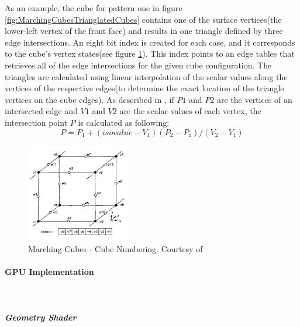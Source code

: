 \documentclass[]{article}
\begin{document}
As an example, the cube for pattern one in figure \ref{fig:MarchingCubesTrianglatedCubes} contains one  of the surface vertices(the lower-left vertex of the front face) and results in one triangle defined by three edge intersections. An eight bit index is created for each case, and it corresponds to the cube's vertex states(see figure \ref{fig:MarchingCubesLabeling}). This index points to an edge tables that retrieves all of the edge intersections for the given cube configuration. The triangles are calculated using linear interpolation of the scalar values along the vertices of the respective edges(to determine the exact location of the triangle vertices on the cube edges). As described in \cite{navpreet2013}, if $P1$ and $P2$ are the vertices of an intersected edge and $V1$ and $V2$ are the scalar values of each vertex, the intersection point $P$ is calculated as following:  
	$$P = P_{1} + (isovalue - V_{1})(P_{2} - P_{1}) / (V_{2} - V_{1})$$

\begin{figure}[hbtp]
    \centering
    \includegraphics[width=0.4\textwidth]{figures/MarchingCubesNumbering.PNG}
    \caption{Marching Cubes - Cube Numbering. Courtesy of \cite{william87}}
    \label{fig:MarchingCubesLabeling}
\end{figure}

\paragraph{GPU Implementation}\mbox{}\\

\subparagraph{Geometry Shader}\mbox{}\\
\end{document}
